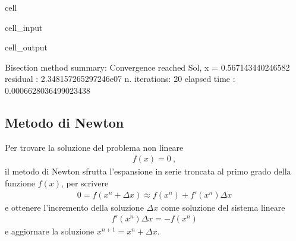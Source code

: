 \documentclass[letterpaper,10pt,italian]{jupyterBook}
\begin{document}
\begin{sphinxuseclass}{cell}
\begin{sphinxVerbatimInput}
\begin{sphinxuseclass}{cell_input}
\end{sphinxuseclass}\end{sphinxVerbatimInput}
\begin{sphinxVerbatimOutput}

\begin{sphinxuseclass}{cell_output}
\begin{sphinxVerbatim}[commandchars=\\\{\}]
Bisection method summary: 
Convergence reached
Sol, x = \PYGZhy{}0.567143440246582
residual     : \PYGZhy{}2.348157265297246e\PYGZhy{}07
n. iterations: 20
elapsed time : 0.0006628036499023438
\end{sphinxVerbatim}

\end{sphinxuseclass}\end{sphinxVerbatimOutput}

\end{sphinxuseclass}

\subsection{Metodo di Newton}
\label{\detokenize{ch/numerics/nonlinear:metodo-di-newton}}
\sphinxAtStartPar
Per trovare la soluzione del problema non lineare
\begin{equation*}
\begin{split}f(x) = 0 \ ,\end{split}
\end{equation*}
\sphinxAtStartPar
il metodo di Newton sfrutta l’espansione in serie troncata al primo grado della funzione \(f(x)\), per scrivere
\begin{equation*}
\begin{split}0 = f(x^n + \Delta x) \approx f(x^n) + f'(x^n) \Delta x \end{split}
\end{equation*}
\sphinxAtStartPar
e ottenere l’incremento della soluzione \(\Delta x\) come soluzione del sistema lineare
\begin{equation*}
\begin{split}f'(x^n) \Delta x = -f(x^n)\end{split}
\end{equation*}
\sphinxAtStartPar
e aggiornare la soluzione \(x^{n+1} = x^{n} + \Delta x\).
\end{document}

